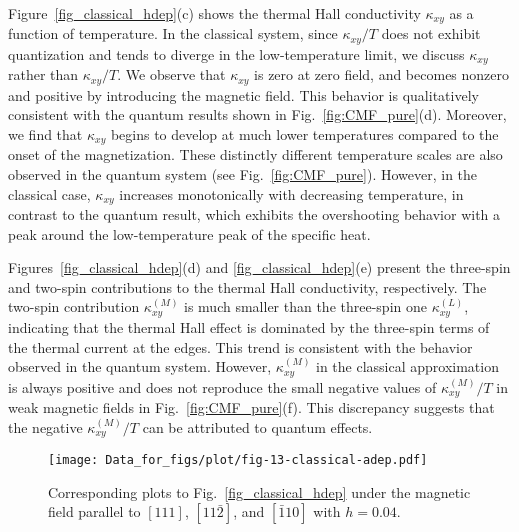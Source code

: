 \documentclass[twocolumn,superscriptaddress,showpacs, longbibliography, aps, prx]{revtex4-2}
\begin{document}
Figure~\ref{fig_classical_hdep}(c) shows the thermal Hall conductivity $\kappa_{xy}$ as a function of temperature.
In the classical system, since $\kappa_{xy}/T$ does not exhibit quantization and tends to diverge in the low-temperature limit, we discuss $\kappa_{xy}$ rather than $\kappa_{xy}/T$.
We observe that $\kappa_{xy}$ is zero at zero field, and becomes nonzero and positive by introducing the magnetic field.  
This behavior is qualitatively consistent with the quantum results shown in Fig.~\ref{fig:CMF_pure}(d).
Moreover, we find that $\kappa_{xy}$ begins to develop at much lower temperatures compared to the onset of the magnetization.
These distinctly different temperature scales are also observed in the quantum system (see Fig.~\ref{fig:CMF_pure}). 
However, in the classical case, $\kappa_{xy}$ increases monotonically with decreasing temperature, in contrast to the quantum result, which exhibits the overshooting behavior with a peak around the low-temperature peak of the specific heat. 

Figures~\ref{fig_classical_hdep}(d) and \ref{fig_classical_hdep}(e) present the three-spin and two-spin contributions to the thermal Hall conductivity, respectively.
The two-spin contribution $\kappa_{xy}^{(M)}$ is much smaller than the three-spin 
one $\kappa_{xy}^{(L)}$, indicating that the thermal Hall effect is dominated by the three-spin terms of the thermal current at the edges.
This trend is consistent with the behavior observed in the quantum system. 
However, $\kappa_{xy}^{(M)}$ in the classical approximation is always positive and does not reproduce the small negative values of $\kappa_{xy}^{(M)}/T$ in weak magnetic fields in Fig.~\ref{fig:CMF_pure}(f). 
This discrepancy suggests that the negative $\kappa_{xy}^{(M)}/T$ can be attributed to quantum effects.

\begin{figure}[tbh] 
\begin{center} 
\texttt{[image: Data\_for\_figs/plot/fig-13-classical-adep.pdf]}
\vspace{-0.5cm} 
\caption{Corresponding plots to Fig.~\ref{fig_classical_hdep} under the magnetic field parallel to $[111]$, $[11\bar{2}]$, and $[\bar{1}10]$ with $h=0.04$.
}
\label{fig_classical_adep004}
\end{center}
\end{figure}
  
\end{document}
